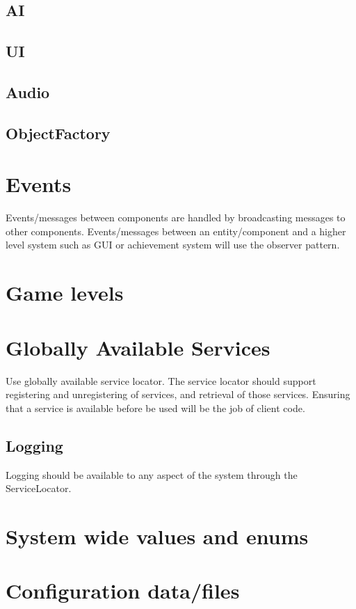 \documentclass[12pt]{article}
\begin{document}
\subsection{	AI}
\subsection{	UI}
\subsection{	Audio}
\subsection{	ObjectFactory}


\section{	Events }
Events/messages between components are handled by broadcasting messages to other components.  Events/messages between an entity/component and a higher level system such as GUI or achievement system will use the observer pattern. 

\section{	Game levels}

\section{ Globally Available Services}
Use globally available service locator.  The service locator should support registering and unregistering of services, and retrieval of those services.  Ensuring that a service is available before be used will be the job of client code.

\subsection{ Logging }
Logging should be available to any aspect of the system through the ServiceLocator.    

\section{	System wide values and enums}

\section{	Configuration data/files}
\end{document}
